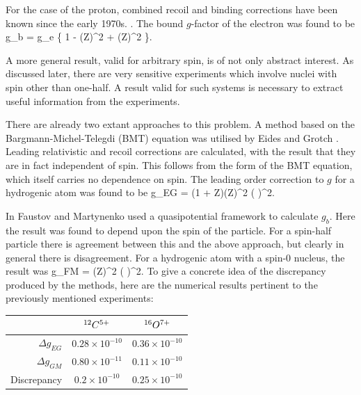 For the case of the proton, combined recoil and binding corrections have been known since the early 1970s.  \cite{Faustov1970422,PhysRevLett.24.39,PhysRevA.4.59}.  The bound $g$-factor of the electron was found to be
\beq
	g_b = g_e \left \{ 1 -  (Z\alpha)^2 
		+  \alpha (Z\alpha)^2  \right \}.
\eeq

A more general result, valid for arbitrary spin, is of not only abstract interest.  As discussed later, there are very sensitive experiments which involve nuclei with spin other than one-half.  A result valid for such systems is necessary to extract useful information from the experiments.
	

There are already two extant approaches to this problem.  A method based on the Bargmann-Michel-Telegdi (BMT) equation was utilised by Eides and Grotch \cite{Eides:1997sq}.  Leading relativistic and recoil corrections are calculated, with the result that they are in fact independent of spin.  This follows from the form of the BMT equation, which itself carries no dependence on spin.  The leading order correction to $g$ for a hydrogenic atom was found to be
\beq
	\Delta g_{EG} = (1 + Z)(Z\alpha)^2 \left(  \right )^2.
\eeq 

In \cite{doi:10.1139/p02-112} Faustov and Martynenko used a quasipotential framework to calculate $g_b$.  Here the result was found to depend upon the spin of the particle.  For a spin-half particle there is agreement between this and the above approach, but clearly in general there is disagreement.   For a hydrogenic atom with a spin-0 nucleus, the result was
\beq
	\Delta g_{FM} =  (Z\alpha)^2 \left(  \right )^2.
\eeq
To give a concrete idea of the discrepancy produced by the methods, here are the numerical results pertinent to the previously mentioned experiments:  
\begin{center}
\begin{tabular}{r c c}
 					&	$^{12}C^{5+}$						&	 $^{16}O^{7+}$	\\	\hline
 $\Delta g_{EG}$		&	$ 0.28 \times 10^{-10}$ 	&	$ 0.36 \times 10^{-10}$	\\
 $\Delta g_{GM}$		&	$ 0.80 \times 10^{-11}$		&	$ 0.11 \times 10^{-10}$	\\
 Discrepancy			&	$ 0.2 \times 10^{-10}$		&	$ 0.25\times 10^{-10}$	\\
\end{tabular}
\end{center}

